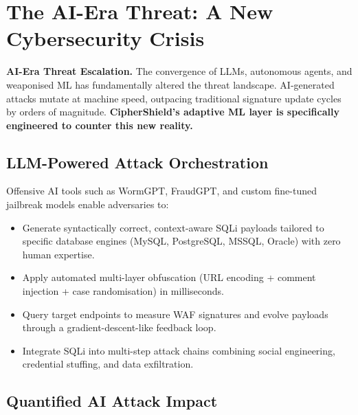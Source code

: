 \documentclass[10pt,twocolumn]{article}
\begin{document}
\section{The AI-Era Threat: A New Cybersecurity Crisis}
\label{sec:ai}

\begin{calloutbox}
{\small\textbf{AI-Era Threat Escalation.}
The convergence of LLMs, autonomous agents, and weaponised ML has
fundamentally altered the threat landscape. AI-generated attacks mutate
at machine speed, outpacing traditional signature update cycles by
orders of magnitude. \textbf{CipherShield's adaptive ML layer is
specifically engineered to counter this new reality.}}
\end{calloutbox}

\subsection{LLM-Powered Attack Orchestration}

Offensive AI tools such as WormGPT, FraudGPT, and custom fine-tuned
jailbreak models enable adversaries to:

\begin{itemize}[leftmargin=*,itemsep=1pt,topsep=2pt]
  \item Generate syntactically correct, context-aware SQLi payloads
        tailored to specific database engines (MySQL, PostgreSQL, MSSQL,
        Oracle) with zero human expertise.
  \item Apply automated multi-layer obfuscation (URL encoding + comment
        injection + case randomisation) in milliseconds.
  \item Query target endpoints to measure WAF signatures and evolve
        payloads through a gradient-descent-like feedback loop.
  \item Integrate SQLi into multi-step attack chains combining social
        engineering, credential stuffing, and data exfiltration.
\end{itemize}

\subsection{Quantified AI Attack Impact}
\end{document}
